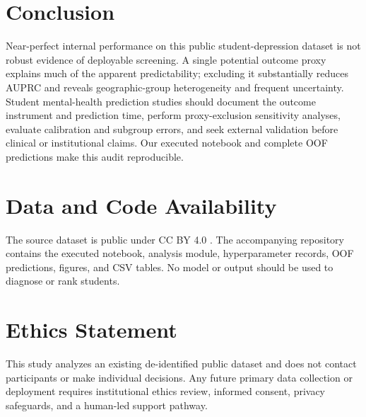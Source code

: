\documentclass[conference]{IEEEtran}
\begin{document}
\section{Conclusion}
Near-perfect internal performance on this public student-depression dataset is not robust evidence of deployable screening. A single potential outcome proxy explains much of the apparent predictability; excluding it substantially reduces AUPRC and reveals geographic-group heterogeneity and frequent uncertainty. Student mental-health prediction studies should document the outcome instrument and prediction time, perform proxy-exclusion sensitivity analyses, evaluate calibration and subgroup errors, and seek external validation before clinical or institutional claims. Our executed notebook and complete OOF predictions make this audit reproducible.

\section*{Data and Code Availability}
The source dataset is public under CC BY 4.0 \cite{haque2026dataset}. The accompanying repository contains the executed notebook, analysis module, hyperparameter records, OOF predictions, figures, and CSV tables. No model or output should be used to diagnose or rank students.

\section*{Ethics Statement}
This study analyzes an existing de-identified public dataset and does not contact participants or make individual decisions. Any future primary data collection or deployment requires institutional ethics review, informed consent, privacy safeguards, and a human-led support pathway.



\end{document}
